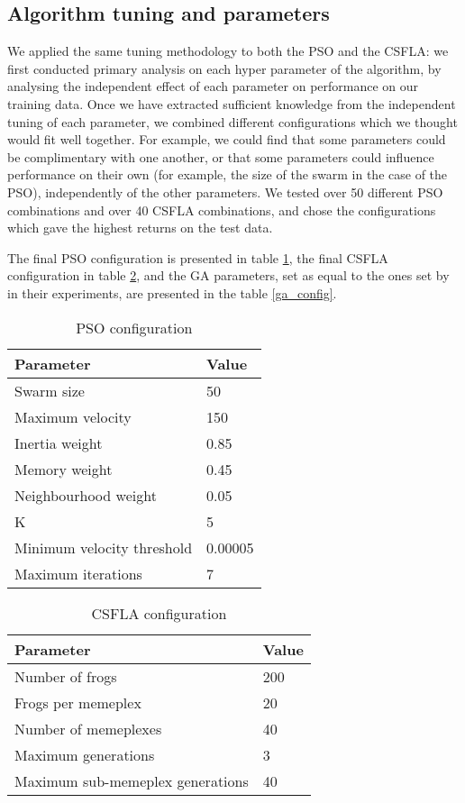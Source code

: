 \documentclass[conference]{IEEEtran}
\begin{document}
\subsection{Algorithm tuning and parameters}
We applied the same tuning methodology to both the PSO and the CSFLA: we first conducted primary analysis on each hyper parameter of the algorithm, by analysing the independent effect of each parameter on performance on our training data. Once we have extracted sufficient knowledge from the independent tuning of each parameter, we combined different configurations which we thought would fit well together. For example, we could find that some parameters could be complimentary with one another, or that some parameters could influence performance on their own (for example, the size of the swarm in the case of the PSO), independently of the other parameters. We tested over 50 different PSO combinations and over 40 CSFLA combinations, and chose the configurations which gave the highest returns on the test data.

The final PSO configuration is presented in table \ref{pso_config}, the final CSFLA configuration in table \ref{csfla_config}, and the GA parameters, set as equal to the ones set by \cite{kampouridis_otero_dc_ga} in their experiments, are presented in the table \ref{ga_config}.

\begin{table}[htbp]
\caption{PSO configuration}\label{pso_config}
\centering
\begin{tabular}{|l|l|}
\hline
Parameter                  & Value   \\ \hline
Swarm size                 & 50      \\
Maximum velocity           & 150     \\
Inertia weight             & 0.85    \\
Memory weight              & 0.45    \\
Neighbourhood weight       & 0.05    \\
K                          & 5       \\
Minimum velocity threshold & 0.00005 \\
Maximum iterations         & 7       \\ \hline
\end{tabular}
\end{table}

\begin{table}[htbp]
\caption{CSFLA configuration}\label{csfla_config}
\centering
\begin{tabular}{|l|l|}
\hline
Parameter                           & Value   \\ \hline
Number of frogs                     & 200      \\
Frogs per memeplex                  & 20     \\
Number of memeplexes                & 40    \\
Maximum generations                 & 3    \\
Maximum sub-memeplex generations    & 40    \\ \hline
\end{tabular}
\end{table}
\end{document}
